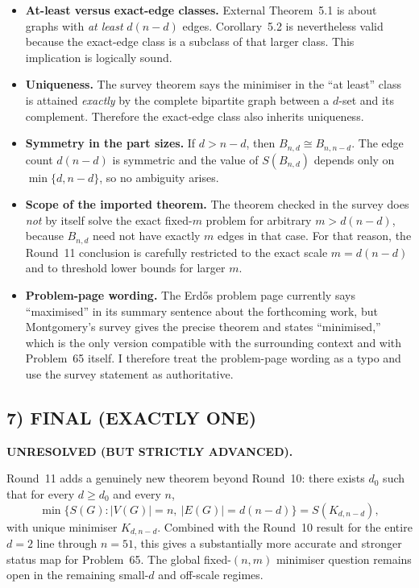 \begin{itemize}
\item \textbf{At-least versus exact-edge classes.}
External Theorem~5.1 is about graphs with \emph{at least} $d(n-d)$ edges. Corollary~5.2 is nevertheless valid because the exact-edge class is a subclass of that larger class. This implication is logically sound.

\item \textbf{Uniqueness.}
The survey theorem says the minimiser in the ``at least'' class is attained \emph{exactly} by the complete bipartite graph between a $d$-set and its complement. Therefore the exact-edge class also inherits uniqueness.

\item \textbf{Symmetry in the part sizes.}
If $d>n-d$, then $B_{n,d}\cong B_{n,n-d}$. The edge count $d(n-d)$ is symmetric and the value of $S(B_{n,d})$ depends only on $\min\{d,n-d\}$, so no ambiguity arises.

\item \textbf{Scope of the imported theorem.}
The theorem checked in the survey does \emph{not} by itself solve the exact fixed-$m$ problem for arbitrary $m>d(n-d)$, because $B_{n,d}$ need not have exactly $m$ edges in that case. For that reason, the Round~11 conclusion is carefully restricted to the exact scale $m=d(n-d)$ and to threshold lower bounds for larger $m$.

\item \textbf{Problem-page wording.}
The Erd\H{o}s problem page currently says ``maximised'' in its summary sentence about the forthcoming work, but Montgomery's survey gives the precise theorem and states ``minimised,'' which is the only version compatible with the surrounding context and with Problem~65 itself. I therefore treat the problem-page wording as a typo and use the survey statement as authoritative.
\end{itemize}

\subsection*{7) FINAL (EXACTLY ONE)}

\textbf{UNRESOLVED (BUT STRICTLY ADVANCED).}

Round~11 adds a genuinely new theorem beyond Round~10:
there exists $d_0$ such that for every $d\ge d_0$ and every $n$,
\[
\min\{S(G): |V(G)|=n,\ |E(G)|=d(n-d)\}=S(K_{d,n-d}),
\]
with unique minimiser $K_{d,n-d}$.
Combined with the Round~10 result for the entire $d=2$ line through $n=51$, this gives a substantially more accurate and stronger status map for Problem~65.
The global fixed-$(n,m)$ minimiser question remains open in the remaining small-$d$ and off-scale regimes.

